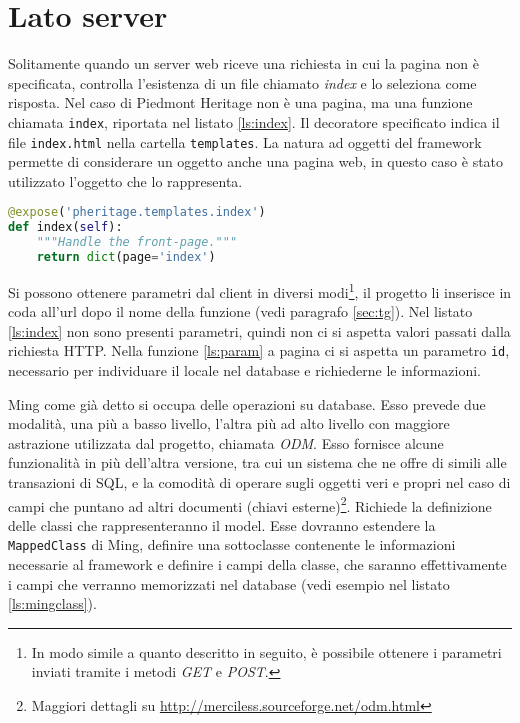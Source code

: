 \section{Lato server}
Solitamente quando un server web riceve una richiesta in cui la pagina non è specificata, controlla l'esistenza di un file chiamato \emph{index} e lo seleziona come risposta. Nel caso di Piedmont Heritage non è una pagina, ma una funzione chiamata \texttt{index}, riportata nel listato \ref{ls:index}. Il decoratore specificato indica il file \texttt{index.html} nella cartella \texttt{templates}. La natura ad oggetti del framework permette di considerare un oggetto anche una pagina web, in questo caso è stato utilizzato l'oggetto che lo rappresenta.
\begin{lstlisting}[label=ls:index,caption={root controller, funzione index, richiamata alla richiesta della pagina web da parte del client.},language=Python]
@expose('pheritage.templates.index')
def index(self):
    """Handle the front-page."""
    return dict(page='index')
\end{lstlisting}

Si possono ottenere parametri dal client in diversi modi\footnote{In modo simile a quanto descritto in seguito, è possibile ottenere i parametri inviati tramite i metodi \emph{GET} e \emph{POST}.}, il progetto li inserisce in coda all'url dopo il nome della funzione (vedi paragrafo \ref{sec:tg}). Nel listato \ref{ls:index} non sono presenti parametri, quindi non ci si aspetta valori passati dalla richiesta HTTP. Nella funzione \ref{ls:param} a pagina \pageref{ls:param} ci si aspetta un parametro \texttt{id}, necessario per individuare il locale nel database e richiederne le informazioni.

Ming come già detto si occupa delle operazioni su database. Esso prevede due modalità, una più a basso livello, l'altra più ad alto livello con maggiore astrazione utilizzata dal progetto, chiamata \emph{ODM}. Esso fornisce alcune funzionalità in più dell'altra versione, tra cui un sistema che ne offre di simili alle transazioni di SQL, e la comodità di operare sugli oggetti veri e propri nel caso di campi che puntano ad altri documenti (chiavi esterne)\footnote{Maggiori dettagli su \url{http://merciless.sourceforge.net/odm.html}}. Richiede la definizione delle classi che rappresenteranno il model. Esse dovranno estendere la \texttt{MappedClass} di Ming, definire una sottoclasse contenente le informazioni necessarie al framework e definire i campi della classe, che saranno effettivamente i campi che verranno memorizzati nel database (vedi esempio nel listato \ref{ls:mingclass}).

